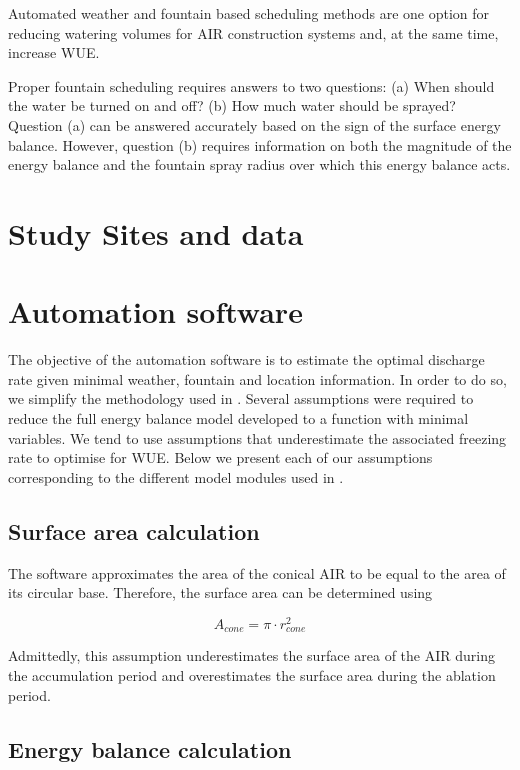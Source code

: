 \documentclass[utf8]{frontiersSCNS}
\begin{document}
Automated weather and fountain based scheduling methods are one option for reducing watering volumes for AIR
construction systems and, at the same time, increase WUE.

Proper fountain scheduling requires answers to two questions: (a) When should the water be turned on and off?
(b) How much water should be sprayed? Question (a) can be answered accurately based on the sign of the surface
energy balance. However, question (b) requires information on both the magnitude of the energy balance and the
fountain spray radius over which this energy balance acts.  

\section{Study Sites and data}

\section{Automation software}
The objective of the automation software is to estimate the optimal discharge rate given minimal weather,
fountain and location information. In order to do so, we simplify the methodology used in
\cite{Balasubramanian_2022}. Several assumptions were required to reduce the full energy balance model developed
to a function with minimal variables. We tend to use assumptions that underestimate the associated freezing rate
to optimise for WUE. Below we present each of our assumptions corresponding to the different model modules used
in \cite{Balasubramanian_2022}. 

\subsection{Surface area calculation} \label{sec:shape}

The software approximates the area of the conical AIR to be equal to the area of its circular base. Therefore,
the surface area can be determined using

\begin{equation} A_{cone} =\pi \cdot r_{cone}^2 \label{eq:Area} \end{equation}

Admittedly, this assumption underestimates the surface area of the AIR during the accumulation period and
overestimates the surface area during the ablation period.  

\subsection{Energy balance calculation} \label{sec:energy}
\end{document}
